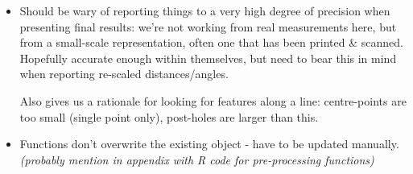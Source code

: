 \documentclass[10pt,fleqn]{article}
\numberwithin{equation}{section}
\numberwithin{figure}{section}
\numberwithin{table}{section}
\begin{document}
\begin{itemize}
\item
Should be wary of reporting things to a very high degree of precision when presenting final results: we're not working from real measurements here, but from a small-scale representation, often one that has been printed \& scanned. Hopefully accurate enough within themselves, but need to bear this in mind when reporting re-scaled distances/angles.

Also gives us a rationale for looking for features along a line: centre-points are too small (single point only), post-holes are larger than this.

\item
Functions don't overwrite the existing object - have to be updated manually.
\textit{(probably mention in appendix with R code for pre-processing functions)
}

\end{itemize}
\newpage



\newpage
\tableofcontents


\newpage


\newpage


\newpage


\newpage


\newpage

%


\newpage


\newpage

%


\newpage


\newpage
\end{document}

